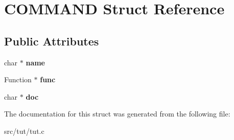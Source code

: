 \hypertarget{structCOMMAND}{
\section{COMMAND Struct Reference}
\label{structCOMMAND}
}
\subsection*{Public Attributes}
\begin{DoxyCompactItemize}
\item 
\hypertarget{structCOMMAND_a1f96d025e6532ee5bb6d5ae32f15985a}{
char $\ast$ {\bfseries name}}
\label{structCOMMAND_a1f96d025e6532ee5bb6d5ae32f15985a}

\item 
\hypertarget{structCOMMAND_ac18a557f9ae6559c0f387bf42d9baef3}{
Function $\ast$ {\bfseries func}}
\label{structCOMMAND_ac18a557f9ae6559c0f387bf42d9baef3}

\item 
\hypertarget{structCOMMAND_a065e69a70bee89c08758fbc8f57cf893}{
char $\ast$ {\bfseries doc}}
\label{structCOMMAND_a065e69a70bee89c08758fbc8f57cf893}

\end{DoxyCompactItemize}


The documentation for this struct was generated from the following file:\begin{DoxyCompactItemize}
\item 
src/tut/tut.c\end{DoxyCompactItemize}
